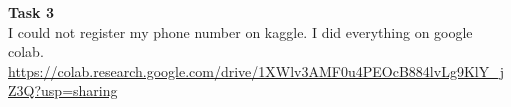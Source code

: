 {\large \bf Task 3}\\
I could not register my phone number on kaggle. I did everything on google colab.\\
\url{https://colab.research.google.com/drive/1XWlv3AMF0u4PEOcB884lvLg9KlY_jZ3Q?usp=sharing}

